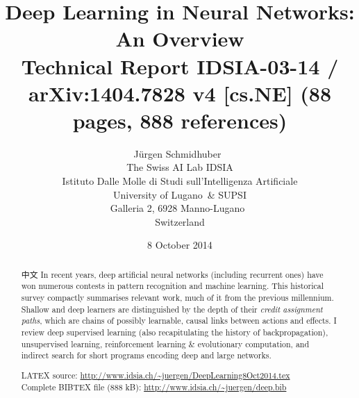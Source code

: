 \documentclass[letterpaper]{article}
\begin{document}
\begin{CJK*}{UTF8}{gbsn}

\title{Deep Learning in  Neural Networks: An Overview  \\
{\small Technical Report IDSIA-03-14 / arXiv:1404.7828 v4 [cs.NE] (88 pages, 888 references)}}

\date{8 October 2014}
\author{J\"{u}rgen Schmidhuber~\\
The Swiss AI Lab IDSIA \\
Istituto Dalle Molle di Studi sull'Intelligenza  Artificiale\\
University of Lugano~\& SUPSI \\
Galleria 2, 6928 Manno-Lugano~\\
Switzerland}
\maketitle


\begin{abstract}
中文
In recent years, deep artificial neural networks (including recurrent ones) have won numerous contests in pattern recognition and machine learning.
This historical survey compactly summarises relevant work, much of it from the previous millennium. Shallow and deep learners are distinguished by the depth of their {\em credit assignment paths}, which are chains of possibly learnable, causal links between 
actions and effects. I review deep supervised learning (also recapitulating the history of backpropagation), unsupervised learning, reinforcement learning \& evolutionary computation, and indirect search for short programs encoding deep and large networks.

\vspace{7mm}
\noindent
LATEX source: \url{http://www.idsia.ch/~juergen/DeepLearning8Oct2014.tex} \\
Complete BIBTEX file (888 kB): \url{http://www.idsia.ch/~juergen/deep.bib}

\end{abstract}




\end{CJK*}
\end{document}
